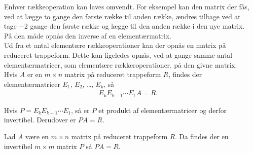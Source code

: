 Enhver rækkeoperation kan laves omvendt. For eksempel kan den matrix der fås, ved at lægge to gange den første række til anden række, ændres tilbage ved at tage $-2$ gange den første række og lægge til den anden række i den nye matrix. På den måde opnås den inverse af en elementærmatrix. \\
Ud fra et antal elementære rækkeoperationer kan der opnås en matrix på reduceret trappeform. Dette kan ligeledes opnås, ved at gange samme antal elementærmatricer, som elementære rækkeroperationer, på den givne matrix. 
Hvis $A$ er en $m \times n$ matrix på reduceret trappeform $R$, findes der elementærmatricer $E_1$, $E_2$, \dots, $E_k$, så 
\begin{align*}
E_k E_{k-1} \dotsm E_1 A = R.
\end{align*}

Hvis $P = E_k E_{k-1} \dotsm E_1$, så er $P$ et produkt af elementærmatricer og derfor invertibel. Derudover er $PA = R$. 

\begin{stn}\label{stn:mn_invertibel}
Lad $A$ være en $m \times n$ matrix på reduceret trappeform $R$. Da findes der en invertibel $m \times m$ matrix $P$ så $PA=R$. 
\end{stn}

